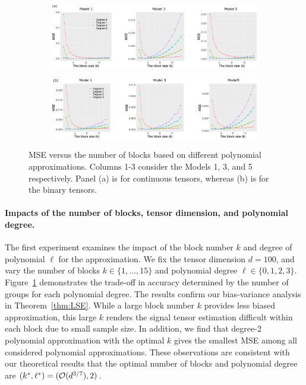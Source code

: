 \documentclass[12pt]{article}
\theoremstyle{definition}
\begin{document}
\begin{figure}[t!]
    \centering
    \begin{subfigure}[b]{.9\textwidth}
    \includegraphics[width = \textwidth]{figure/deg_conti.pdf}    
    \end{subfigure}
    
    \vspace{.5cm}
    
    \begin{subfigure}[b]{.9\textwidth}
    \includegraphics[width = \textwidth]{figure/deg_binary.pdf}    
    \end{subfigure}
    \caption{MSE versus the number of blocks based on different polynomial approximations. Columns 1-3 consider the Models 1, 3, and 5 respectively. Panel (a) is for continuous tensors, whereas (b) is for the binary tensors.}
    \label{fig:degk}
\end{figure}

\paragraph{Impacts of the number of blocks, tensor dimension, and polynomial degree.}
The first experiment examines the impact of the block number $k$ and degree of polynomial $\ell$ for the approximation. We fix the tensor dimension $d = 100$, and vary the number of blocks $k\in\{1,\ldots,15\}$ and polynomial degree $\ell\in\{0,1,2,3\}.$
Figure~\ref{fig:degk} demonstrates the trade-off in accuracy determined by the number of groups for each polynomial degree. The results confirm our bias-variance analysis in Theorem~\ref{thm:LSE}. While a large block number $k$ provides less biased approximation, this large $k$ renders the signal tensor estimation difficult within each block due to small sample size. In addition, we find that degree-2 polynomial approximation with the optimal $k$ gives the smallest MSE among all considered polynomial approximations. These observations are consistent with our theoretical results that the optimal number of blocks and polynomial degree are $(k^*,\ell^*)=(\mathcal{O}(d^{3/7}),2)$. 
 
\end{document}
